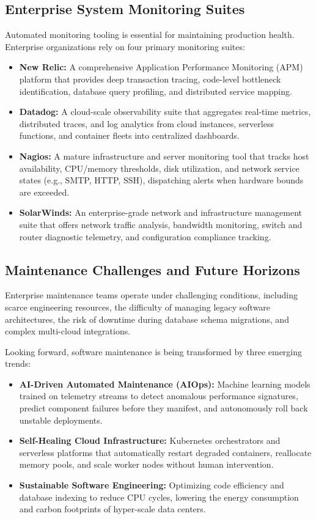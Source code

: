 \documentclass[11pt,a4paper]{article}
\begin{document}
\subsection{Enterprise System Monitoring Suites}
Automated monitoring tooling is essential for maintaining production health. Enterprise organizations rely on four primary monitoring suites:
\begin{itemize}
    \item \textbf{New Relic:} A comprehensive Application Performance Monitoring (APM) platform that provides deep transaction tracing, code-level bottleneck identification, database query profiling, and distributed service mapping.
    \item \textbf{Datadog:} A cloud-scale observability suite that aggregates real-time metrics, distributed traces, and log analytics from cloud instances, serverless functions, and container fleets into centralized dashboards.
    \item \textbf{Nagios:} A mature infrastructure and server monitoring tool that tracks host availability, CPU/memory thresholds, disk utilization, and network service states (e.g., SMTP, HTTP, SSH), dispatching alerts when hardware bounds are exceeded.
    \item \textbf{SolarWinds:} An enterprise-grade network and infrastructure management suite that offers network traffic analysis, bandwidth monitoring, switch and router diagnostic telemetry, and configuration compliance tracking.
\end{itemize}

\subsection{Maintenance Challenges and Future Horizons}
Enterprise maintenance teams operate under challenging conditions, including scarce engineering resources, the difficulty of managing legacy software architectures, the risk of downtime during database schema migrations, and complex multi-cloud integrations.

Looking forward, software maintenance is being transformed by three emerging trends:
\begin{itemize}
    \item \textbf{AI-Driven Automated Maintenance (AIOps):} Machine learning models trained on telemetry streams to detect anomalous performance signatures, predict component failures before they manifest, and autonomously roll back unstable deployments.
    \item \textbf{Self-Healing Cloud Infrastructure:} Kubernetes orchestrators and serverless platforms that automatically restart degraded containers, reallocate memory pools, and scale worker nodes without human intervention.
    \item \textbf{Sustainable Software Engineering:} Optimizing code efficiency and database indexing to reduce CPU cycles, lowering the energy consumption and carbon footprints of hyper-scale data centers.
\end{itemize}
\end{document}
